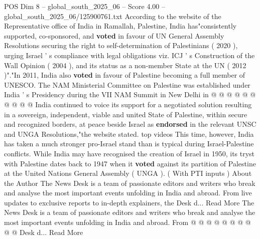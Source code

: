 \begin{textsample}{POS Dim 8 – global\_south\_2025\_06 – Score 4.00 – global\_south\_2025\_06/125900761.txt}
According to the website of the Representative office of India in Ramallah, Palestine, India has"consistently supported, co-sponsored, and \textbf{voted} in favour of UN General Assembly Resolutions securing the right to self-determination of Palestinians ( 2020 ), urging Israel ' s compliance with legal obligations viz.
ICJ ' s Construction of the Wall Opinion ( 2004 ), and its status as a non-member State at the UN ( 2012 )"."In 2011, India also \textbf{voted} in favour of Palestine becoming a full member of UNESCO.
The NAM Ministerial Committee on Palestine was established under India ' s Presidency during the VII NAM Summit in New Delhi in @ @ @ @ @ @ @ @ @ @ India continued to voice its support for a negotiated solution resulting in a sovereign, independent, viable and united State of Palestine, within secure and recognized borders, at peace beside Israel as \textbf{endorsed} in the relevant UNSC and UNGA Resolutions,"the website stated. top videos This time, however, India has taken a much stronger pro-Israel stand than is typical during Israel-Palestine conflicts.
While India may have recognised the creation of Israel in 1950, its tryst with Palestine dates back to 1947 when it \textbf{voted} against its partition of Palestine at the United Nations General Assembly ( UNGA ). ( With PTI inputs ) About the Author The News Desk is a team of passionate editors and writers who break and analyse the most important events unfolding in India and abroad.
From live updates to exclusive reports to in-depth explainers, the Desk d...
Read More The News Desk is a team of passionate editors and writers who break and analyse the most important events unfolding in India and abroad.
From @ @ @ @ @ @ @ @ @ @ Desk d...
Read More

\end{textsample}
